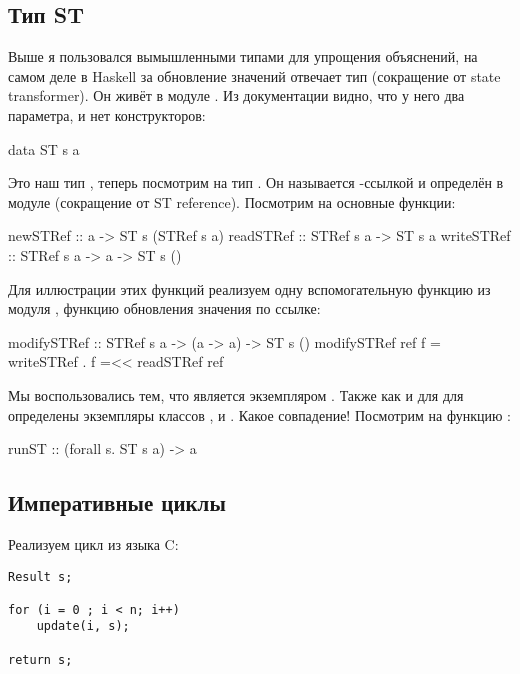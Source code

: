 \subsection{Тип ST}

Выше я пользовался вымышленными типами для упрощения объяснений,
на самом деле в Haskell за обновление значений отвечает тип 
(сокращение от state transformer).
Он живёт в модуле . Из документации
видно, что у него два параметра, и нет конструкторов:

\begin{code}
data ST s a
\end{code}

Это наш тип , теперь посмотрим на тип .
Он называется -ссылкой и определён в модуле 
(сокращение от ST reference). 
Посмотрим на основные функции:

\begin{code}
newSTRef    :: a -> ST s (STRef s a)
readSTRef   :: STRef s a -> ST s a
writeSTRef  :: STRef s a -> a -> ST s ()
\end{code}

Для иллюстрации этих функций реализуем одну 
вспомогательную функцию из модуля , функцию
обновления значения по ссылке:

\begin{code}
modifySTRef :: STRef s a -> (a -> a) -> ST s ()
modifySTRef ref f = writeSTRef . f =<< readSTRef ref 
\end{code}

Мы воспользовались тем, что  является экземпляром .
Также как и для  для  определены экземпляры 
классов ,  и . 
Какое совпадение! Посмотрим на функцию :

\begin{code}
runST :: (forall s. ST s a) -> a
\end{code}

\subsection{Императивные циклы}

Реализуем  цикл из языка C:

\begin{verbatim}
Result s;

for (i = 0 ; i < n; i++)
    update(i, s);

return s;
\end{verbatim}

